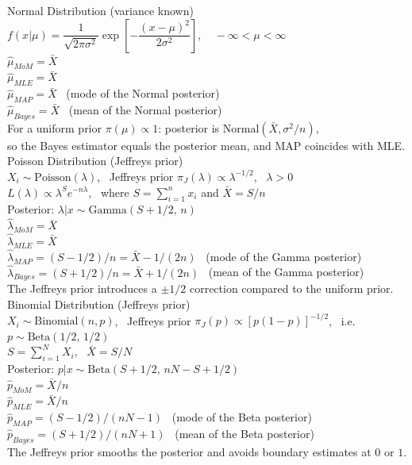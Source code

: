 Normal Distribution (variance known)\\
$f(x|\mu) = \dfrac{1}{\sqrt{2\pi\sigma^2}} \exp\!\left[-\dfrac{(x-\mu)^2}{2\sigma^2}\right], \quad -\infty < \mu < \infty$\\
$\hat{\mu}_{MoM} = \bar{X}$\\
$\hat{\mu}_{MLE} = \bar{X}$\\
$\hat{\mu}_{MAP} = \bar{X}$ \ (mode of the Normal posterior)\\
$\hat{\mu}_{Bayes} = \bar{X}$ \ (mean of the Normal posterior)\\
For a uniform prior $\pi(\mu)\propto1$: posterior is $\text{Normal}(\bar{X}, \sigma^2/n)$,\\
so the Bayes estimator equals the posterior mean, and MAP coincides with MLE.\\


Poisson Distribution (Jeffreys prior)\\
$X_i \sim \text{Poisson}(\lambda)$, \ Jeffreys prior $\pi_J(\lambda) \propto \lambda^{-1/2}$, \ $\lambda>0$\\
$L(\lambda) \propto \lambda^S e^{-n\lambda}$, \ where $S = \sum_{i=1}^n x_i$ and $\bar{X} = S/n$\\
Posterior: $\lambda | x \sim \text{Gamma}(S + 1/2,\, n)$\\
$\hat{\lambda}_{MoM} = \bar{X}$\\
$\hat{\lambda}_{MLE} = \bar{X}$\\
$\hat{\lambda}_{MAP} = (S - 1/2)/n = \bar{X} - 1/(2n)$ \ (mode of the Gamma posterior)\\
$\hat{\lambda}_{Bayes} = (S + 1/2)/n = \bar{X} + 1/(2n)$ \ (mean of the Gamma posterior)\\
The Jeffreys prior introduces a $\pm 1/2$ correction compared to the uniform prior.\\

Binomial Distribution (Jeffreys prior)\\
$X_i \sim \text{Binomial}(n, p)$, \ Jeffreys prior $\pi_J(p) \propto [p(1-p)]^{-1/2}$, \ i.e. $p \sim \text{Beta}(1/2,\,1/2)$\\
$S = \sum_{i=1}^N X_i$, \ $\bar{X} = S / N$\\
Posterior: $p | x \sim \text{Beta}(S + 1/2,\, nN - S + 1/2)$\\
$\hat{p}_{MoM} = \bar{X}/n$\\
$\hat{p}_{MLE} = \bar{X}/n$\\
$\hat{p}_{MAP} = (S - 1/2)/(nN - 1)$ \ (mode of the Beta posterior)\\
$\hat{p}_{Bayes} = (S + 1/2)/(nN + 1)$ \ (mean of the Beta posterior)\\
The Jeffreys prior smooths the posterior and avoids boundary estimates at $0$ or $1$.\\

